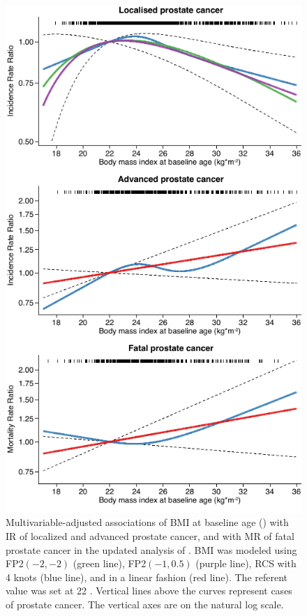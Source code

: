 \begin{figure}[p]
\centering
\includegraphics[width=.85\linewidth]{figures/paper1_1997.pdf}
\caption[Associations of BMI at baseline age with localized, advanced, and fatal prostate cancer]{Multivariable-adjusted associations of BMI at baseline age (\kgmsq) with IR of localized and advanced prostate cancer, and with MR of fatal prostate cancer in the updated analysis of . BMI was modeled using FP2$(-2,-2)$ (green line), FP2$(-1,0.5)$ (purple line), RCS with 4 knots (blue line), and in a linear fashion (red line).  The referent value was set at 22 \kgmsq. Vertical lines above the curves represent cases of prostate cancer. The vertical axes are on the natural log scale.}
\label{fig:paper1_1997}
\end{figure}



